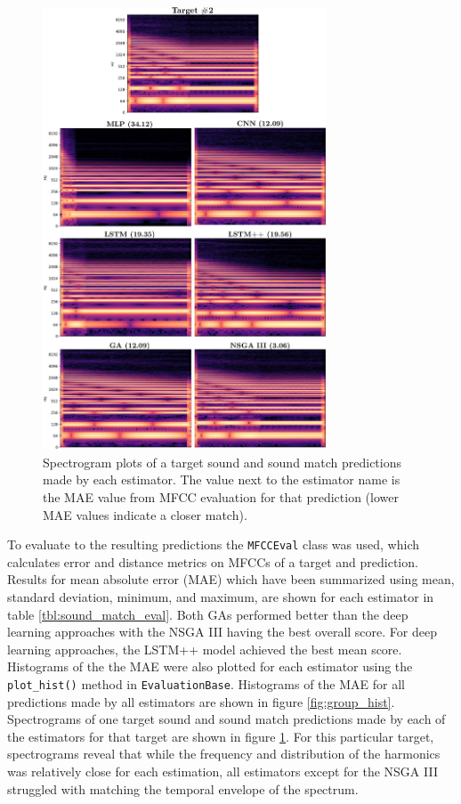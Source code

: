 \begin{figure}[t]
\begin{center}
\includegraphics[width=0.75\textwidth]{spect_group_v1.png}
\caption{Spectrogram plots of a target sound and sound match predictions made by each estimator. The value next to the estimator name is the MAE value from MFCC evaluation for that prediction (lower MAE values indicate a closer match).}
\label{fig:group_spect}
\end{center}
\end{figure}

To evaluate to the resulting predictions the \texttt{MFCCEval} class was used, which calculates error and distance metrics on MFCCs of a target and prediction. Results for mean absolute error (MAE) which have been summarized using mean, standard deviation, minimum, and maximum, are shown for each estimator in table \ref{tbl:sound_match_eval}. Both GAs performed better than the deep learning approaches with the NSGA III having the best overall score. For deep learning approaches, the LSTM++ model achieved the best mean score. Histograms of the the MAE were also plotted for each estimator using the \texttt{plot_hist()} method in \texttt{EvaluationBase}. Histograms of the MAE for all predictions made by all estimators are shown in figure \ref{fig:group_hist}. Spectrograms of one target sound and sound match predictions made by each of the estimators for that target are shown in figure \ref{fig:group_spect}. For this particular target, spectrograms reveal that while the frequency and distribution of the harmonics was relatively close for each estimation, all estimators except for the NSGA III struggled with matching the temporal envelope of the spectrum.

